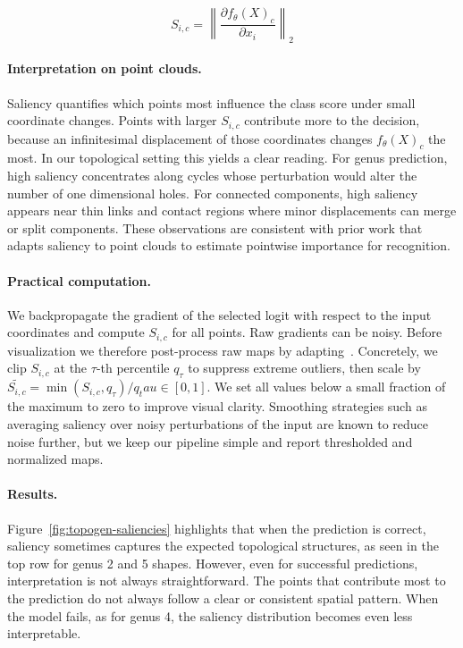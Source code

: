 \begin{equation}
  S_{i,c} = \left\| \frac{\partial f_\theta(X)_c}{\partial x_i} \right\|_2
\end{equation}

\paragraph{Interpretation on point clouds.}
Saliency quantifies which points most influence the class score under small coordinate changes. Points with larger $S_{i,c}$ contribute more to the decision, because an infinitesimal displacement of those coordinates changes $f_\theta(X)_c$ the most. In our topological setting this yields a clear reading. For genus prediction, high saliency concentrates along cycles whose perturbation would alter the number of one dimensional holes. For connected components, high saliency appears near thin links and contact regions where minor displacements can merge or split components. These observations are consistent with prior work that adapts saliency to point clouds to estimate pointwise importance for recognition.

\paragraph{Practical computation.}
We backpropagate the gradient of the selected logit with respect to the input coordinates and compute $S_{i,c}$ for all points. Raw gradients can be noisy. Before visualization we therefore post-process raw maps by adapting~\cite{smoothgrad}. Concretely, we clip $S_{i,c}$ at the $\tau$-th percentile $q_\tau$ to suppress extreme outliers, then scale by $\tilde{S_{i,c}} = \min(S_{i,c},q_\tau)/q_tau \in [0,1]$. We set all values below a small fraction of the maximum to zero to improve visual clarity. Smoothing strategies such as averaging saliency over noisy perturbations of the input are known to reduce noise further, but we keep our pipeline simple and report thresholded and normalized maps.

\paragraph{Results.}
Figure~\ref{fig:topogen-saliencies} highlights that when the prediction is correct, saliency sometimes captures the expected topological structures, as seen in the top row for genus 2 and 5 shapes. However, even for successful predictions, interpretation is not always straightforward. The points that contribute most to the prediction do not always follow a clear or consistent spatial pattern. When the model fails, as for genus 4, the saliency distribution becomes even less interpretable.

